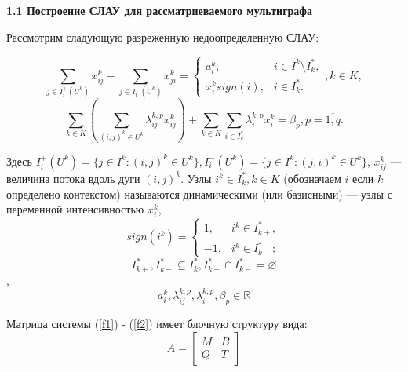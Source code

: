\documentclass[14pt]{extarticle}%
\begin{document}
\textbf{1.1 Построение СЛАУ для рассматриеваемого мультиграфа}

Рассмотрим сладующую разреженную недоопределенную СЛАУ:

\begin{equation}
 \sum_{j\in I^+_i(U^k)} x^k_{ij}-\sum_{j\in I^-_i(U^k)}x^k_{ji}=\left\{\begin{matrix}
a^k_i, & i\in I^k\setminus I^*_k,\\ 
x^k_i sign(i), & i\in I^*_k.
\end{matrix}\right., k\in K,\label{f1}   
\end{equation}
 \begin{equation}
     \sum_{k\in K}\left(\sum_{(i,j)^k\in U^k}\lambda^{k,p}_{ij}x^k_{ij}\right)+\sum_{k\in K}\sum_{i\in I^*_k}\lambda^{k,p}_ix^k_i=\beta_p, p=\overline{1,q}. \label{f2}
 \end{equation}
 
Здесь $I^+_i(U^k)=\{j\in I^k:(i,j)^k\in U^k\}, I^-_i(U^k)=\{j\in I^k:(j,i)^k\in U^k\}$, $x^k_{ij}$ --- величина потока вдоль дуги $(i,j)^k$. Узлы $i^k\in I^*_k, k\in K$ (обозначаем $i$ если $k$ определено контекстом) называются динамическими (или базисными) --- узлы с переменной интенсивностью $x^k_i$,\\
$$sign(i^k)=\left\{
\begin{matrix}
1,  & i^k\in I^*_{k+},\\
-1, & i^k\in I^*_{k-};
\end{matrix}
\right.$$
$$I^*_{k+}, I^*_{k-}\subseteq I^*_k, I^*_{k+} \cap I^*_{k-}=\varnothing$$,
$$a^k_i, \lambda^{k,p}_{ij}, \lambda^{k,p}_i, \beta_p\in \mathbb{R}$$

Матрица системы (\ref{f1}) - (\ref{f2}) имеет блочную структуру вида:
$$A=\left[\begin{matrix}
M&B\\
Q&T
\end{matrix}\right]$$
\end{document}
